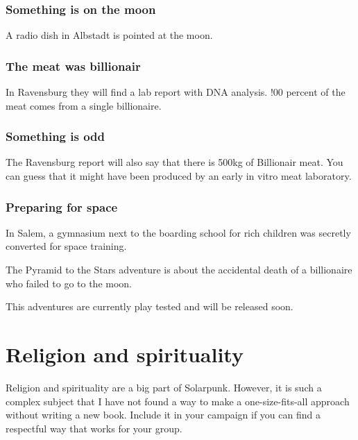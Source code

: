 \subsubsection{Something is on the moon}

A radio dish in Albstadt is pointed at the moon.

\subsubsection{The meat was billionair}

In Ravensburg they will find a lab report with DNA analysis. !00 percent of the meat comes from a single billionaire.

\subsubsection{Something is odd}

The Ravensburg report will also say that there is 500kg of Billionair meat. You can guess that it might have been produced by an early in vitro meat laboratory.

\subsubsection{Preparing for space}

In Salem, a gymnasium next to the boarding school for rich children was secretly converted for space training.

The Pyramid to the Stars adventure is about the accidental death of a billionaire who failed to go to the moon.

\begin{warning}
    This adventures are currently play tested and will be released soon.
\end{warning}
\newpage



\section{Religion and spirituality}

\begin{warning}
    Religion and spirituality are a big part of Solarpunk. However, it is such a complex subject that I have not found a way to make a one-size-fits-all approach without writing a new book. Include it in your campaign if you can find a respectful way that works for your group.
\end{warning}

